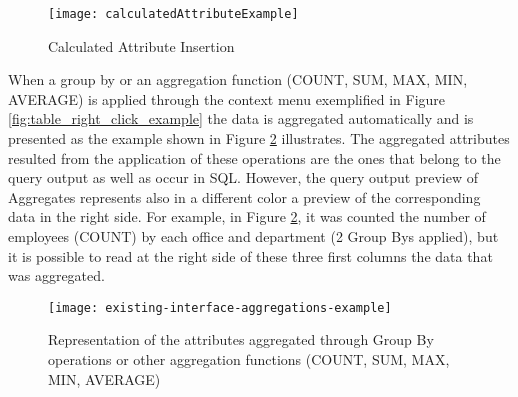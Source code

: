 \begin{figure}[tb]
	\centering
	\texttt{[image: calculatedAttributeExample]}
	\caption{Calculated Attribute Insertion}
	\label{fig:calculated_attribute_example}
\end{figure}

When a group by or an aggregation function (COUNT, SUM, MAX, MIN, AVERAGE) is applied through the context menu exemplified in Figure \ref{fig:table_right_click_example} the data is aggregated automatically and is presented as the example shown in Figure \ref{fig:aggregations_example} illustrates. The aggregated attributes resulted from the application of these operations are the ones that belong to the query output as well as occur in SQL. However, the query output preview of Aggregates represents also in a different color a preview of the corresponding data in the right side. For example, in Figure \ref{fig:aggregations_example}, it was counted the number of employees (COUNT) by each office and department (2 Group Bys applied), but it is possible to read at the right side of these three first columns the data that was aggregated.


\begin{figure}[tb]
	\centering
	\texttt{[image: existing-interface-aggregations-example]}
	\caption{Representation of the attributes aggregated through Group By operations or other aggregation functions (COUNT, SUM, MAX, MIN, AVERAGE)}
	\label{fig:aggregations_example}
\end{figure}

